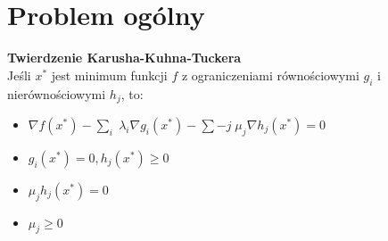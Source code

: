 \section{Problem ogólny}
\textbf{Twierdzenie Karusha-Kuhna-Tuckera} \\
Jeśli \( x^* \) jest minimum funkcji \( f \) z ograniczeniami równościowymi \( g_i \) i nierównościowymi \( h_j \), to:
\begin{itemize}
	\onehalfspacing
	\item \( \nabla f(x^*) - \sum_{i}\; \lambda_i \nabla g_i(x^*) - \sum-{j}\; \mu_j \nabla h_j(x^*) = 0 \)
	\item \( g_i(x^*) = 0, h_j(x^*) \geq 0 \)
	\item \( \mu_jh_j(x^*) = 0 \)
	\item \( \mu_j \geq 0 \)
\end{itemize}